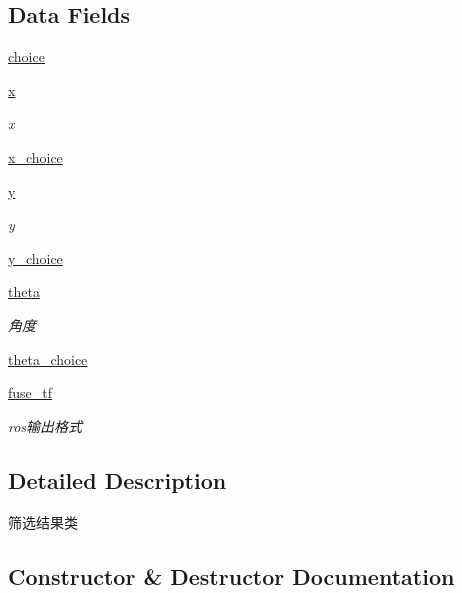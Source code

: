 \subsection*{Data Fields}
\begin{DoxyCompactItemize}
\item 
\hyperlink{classfuse___g___a_1_1_s_e_l_e_c_t_e_d_af493a2d0052caa99e3145d1428d5d192}{choice}
\item 
\hyperlink{classfuse___g___a_1_1_s_e_l_e_c_t_e_d_ab7e4372227ead27a500b051bd2516243}{x}
\begin{DoxyCompactList}\small\item\em x \end{DoxyCompactList}\item 
\hyperlink{classfuse___g___a_1_1_s_e_l_e_c_t_e_d_a532cbc912ed00b80a75778c11c53eeb8}{x\+\_\+choice}
\item 
\hyperlink{classfuse___g___a_1_1_s_e_l_e_c_t_e_d_a9b7c72f2da415c2ab54925216f351138}{y}
\begin{DoxyCompactList}\small\item\em y \end{DoxyCompactList}\item 
\hyperlink{classfuse___g___a_1_1_s_e_l_e_c_t_e_d_aedfc5ac0d500ae6540ca38260d37bc8c}{y\+\_\+choice}
\item 
\hyperlink{classfuse___g___a_1_1_s_e_l_e_c_t_e_d_a2a2782d16fbc265cd0406c09cfa39266}{theta}
\begin{DoxyCompactList}\small\item\em 角度 \end{DoxyCompactList}\item 
\hyperlink{classfuse___g___a_1_1_s_e_l_e_c_t_e_d_a1c8288b33d9ce648cc750783a2650380}{theta\+\_\+choice}
\item 
\hyperlink{classfuse___g___a_1_1_s_e_l_e_c_t_e_d_acba9961c0cb4099df6e203c6013557cb}{fuse\+\_\+tf}
\begin{DoxyCompactList}\small\item\em ros输出格式 \end{DoxyCompactList}\end{DoxyCompactItemize}


\subsection{Detailed Description}
筛选结果类 



\subsection{Constructor \& Destructor Documentation}
\mbox{\label{classfuse___g___a_1_1_s_e_l_e_c_t_e_d_a7438d6257d35c5cf7892004b9b97ec18}} 
